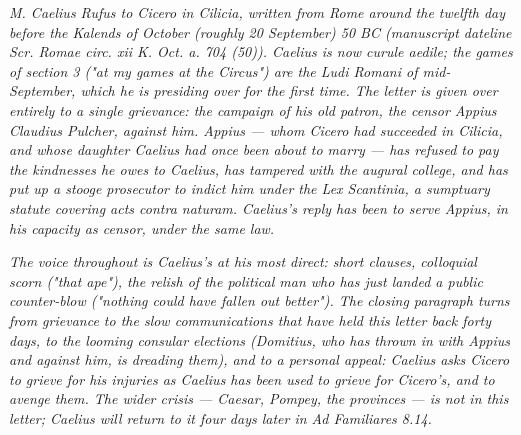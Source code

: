 
\textit{M. Caelius Rufus to Cicero in Cilicia, written from
Rome around the twelfth day before the Kalends of October
(roughly 20 September) 50 BC (manuscript dateline
\textit{Scr. Romae circ. xii K. Oct. a. 704 (50)}). Caelius
is now curule aedile; the games of section 3 ("at my games
at the Circus") are the Ludi Romani of mid-September, which
he is presiding over for the first time. The letter is given
over entirely to a single grievance: the campaign of his old
patron, the censor Appius Claudius Pulcher, against him.
Appius --- whom Cicero had succeeded in Cilicia, and whose
daughter Caelius had once been about to marry --- has refused
to pay the kindnesses he owes to Caelius, has tampered with
the augural college, and has put up a stooge prosecutor to
indict him under the Lex Scantinia, a sumptuary statute
covering acts contra naturam. Caelius's reply has been to
serve Appius, in his capacity as censor, under the same law.}

\textit{The voice throughout is Caelius's at his most direct:
short clauses, colloquial scorn ("that ape"), the relish of
the political man who has just landed a public counter-blow
("nothing could have fallen out better"). The closing
paragraph turns from grievance to the slow communications
that have held this letter back forty days, to the looming
consular elections (Domitius, who has thrown in with Appius
and against him, is dreading them), and to a personal
appeal: Caelius asks Cicero to grieve for his injuries as
Caelius has been used to grieve for Cicero's, and to avenge
them. The wider crisis --- Caesar, Pompey, the provinces ---
is not in this letter; Caelius will return to it four days
later in \textit{Ad Familiares} 8.14.}
